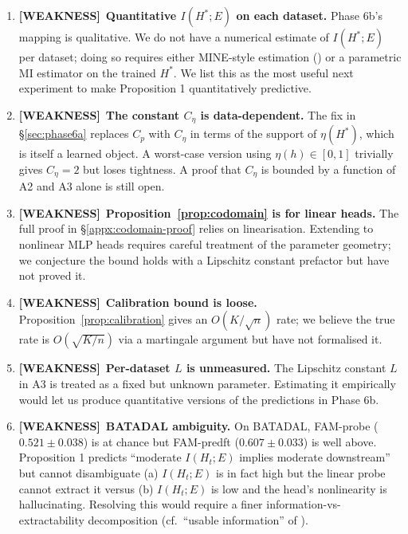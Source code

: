 \documentclass[11pt]{article}
\newcommand{\WEAK}{{\color{red!60!black}\textbf{[WEAKNESS]}}}
\begin{document}
\begin{enumerate}[leftmargin=1.5em]
\item \WEAK\ \textbf{Quantitative $I(H^*;E)$ on each dataset.}
Phase 6b's mapping is qualitative. We do not have a numerical estimate
of $I(H^*;E)$ per dataset; doing so requires either MINE-style estimation
(\citealt{belghazi2018mine}) or a parametric MI estimator on the trained
$H^*$. We list this as the most useful next experiment to make
Proposition 1 quantitatively predictive.

\item \WEAK\ \textbf{The constant $C_\eta$ is data-dependent.}
The fix in \S\ref{sec:phase6a} replaces $C_p$ with $C_\eta$ in
terms of the support of $\eta(H^*)$, which is itself a learned object.
A worst-case version using $\eta(h)\in[0,1]$ trivially gives
$C_\eta=2$ but loses tightness. A proof that
$C_\eta$ is bounded by a function of A2 and A3 alone is still
open.

\item \WEAK\ \textbf{Proposition~\ref{prop:codomain} is for linear heads.}
The full proof in \S\ref{appx:codomain-proof} relies on linearisation.
Extending to nonlinear MLP heads requires careful treatment of the
parameter geometry; we conjecture the bound holds with a Lipschitz
constant prefactor but have not proved it.

\item \WEAK\ \textbf{Calibration bound is loose.}
Proposition~\ref{prop:calibration} gives an $O(K/\sqrt n)$ rate; we
believe the true rate is $O(\sqrt{K/n})$ via a martingale argument but
have not formalised it.

\item \WEAK\ \textbf{Per-dataset $L$ is unmeasured.}
The Lipschitz constant $L$ in A3 is treated as a fixed but unknown
parameter. Estimating it empirically would let us produce
quantitative versions of the predictions in Phase 6b.

\item \WEAK\ \textbf{BATADAL ambiguity.}
On BATADAL, FAM-probe ($0.521\pm 0.038$) is at chance but FAM-predft
($0.607\pm 0.033$) is well above. Proposition 1 predicts ``moderate
$I(H_t;E)$ implies moderate downstream'' but cannot disambiguate (a)
$I(H_t;E)$ is in fact high but the linear probe cannot extract it
versus (b) $I(H_t;E)$ is low and the head's nonlinearity is
hallucinating. Resolving this would require a finer
information-vs-extractability decomposition (cf.\ ``usable information''
of \citealp{xu2020theory}).
\end{enumerate}
\end{document}
